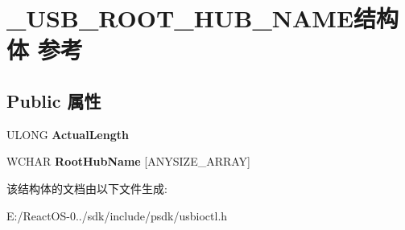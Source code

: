 \hypertarget{struct___u_s_b___r_o_o_t___h_u_b___n_a_m_e}{}\section{\+\_\+\+U\+S\+B\+\_\+\+R\+O\+O\+T\+\_\+\+H\+U\+B\+\_\+\+N\+A\+M\+E结构体 参考}
\label{struct___u_s_b___r_o_o_t___h_u_b___n_a_m_e}
\subsection*{Public 属性}
\begin{DoxyCompactItemize}
\item 
\mbox{\label{struct___u_s_b___r_o_o_t___h_u_b___n_a_m_e_a6693e6d778b88a77c1f887254f160baf}} 
U\+L\+O\+NG {\bfseries Actual\+Length}
\item 
\mbox{\label{struct___u_s_b___r_o_o_t___h_u_b___n_a_m_e_aa38bcdf515e786971a42a83cf34b0c9d}} 
W\+C\+H\+AR {\bfseries Root\+Hub\+Name} \mbox{[}A\+N\+Y\+S\+I\+Z\+E\+\_\+\+A\+R\+R\+AY\mbox{]}
\end{DoxyCompactItemize}


该结构体的文档由以下文件生成\+:\begin{DoxyCompactItemize}
\item 
E\+:/\+React\+O\+S-\/0../sdk/include/psdk/usbioctl.\+h\end{DoxyCompactItemize}
